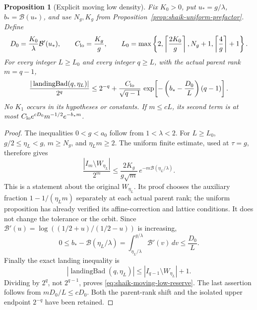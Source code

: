 \documentclass[11pt]{article}
\newtheorem{proposition}{Proposition}
\theoremstyle{remark}\newtheorem{remark}[proposition]{Remark}
\begin{document}
\begin{proposition}[Explicit moving low density]\label{prop:shaik-moving-low-reserve}
Fix \(K_0>0\), put \(u_*=g/\lambda\), \(b_*=\mathcal B(u_*)\), and use
\(N_g,K_g\) from Proposition~\ref{prop:shaik-uniform-prefactor}. Define
\[
 D_0=\frac{K_0}{\lambda}\mathcal B'(u_*),\qquad C_{\rm lo}=\frac{K_g}{g},
 \qquad
 L_0=\max\left\{2,\left\lceil\frac{2K_0}{g}\right\rceil,
                    N_g+1,\left\lceil\frac4g\right\rceil+1\right\}.
\]
For every integer \(L\ge L_0\) and every integer \(q\ge L\), with
the actual parent rank \(m=q-1\),
\begin{equation}\label{eq:shaik-moving-low-reserve}
 \frac{|\operatorname{landingBad}(q,\eta_L)|}{2^q}
 \le 2^{-q}+\frac{C_{\rm lo}}{\sqrt{q-1}}\,
       \exp\!\left[-\left(b_*-\frac{D_0}{L}\right)(q-1)\right].
\end{equation}
No \(K_1\) occurs in its hypotheses or constants.
If \(m\le cL\), its second term is at most
\(C_{\rm lo}e^{cD_0}m^{-1/2}e^{-b_*m}\).
\end{proposition}
\begin{proof}
The inequalities \(0<g<a_0\) follow from \(1<\lambda<2\).
For \(L\ge L_0\),
\(g/2\le\eta_L<g\), \(m\ge N_g\), and \(\eta_Lm\ge2\).
The uniform finite estimate, used at \(\tau=g\), therefore gives
\[
 \frac{|I_m\setminus W_{\eta_L}|}{2^m}
 \le \frac{2K_g}{g\sqrt m}\,
           e^{-m\mathcal B(\eta_L/\lambda)}.
\]
This is a statement about the original \(W_{\eta_L}\).
Its proof chooses the auxiliary fraction
\(1-1/(\eta_Lm)\) separately at each actual parent rank;
the uniform proposition has already verified its affine-correction
and lattice conditions. It does not change the tolerance or the orbit.
Since
\(\mathcal B'(u)=\log((1/2+u)/(1/2-u))\) is increasing,
\[
 0\le b_*-\mathcal B(\eta_L/\lambda)
   =\int_{\eta_L/\lambda}^{g/\lambda}\mathcal B'(v)\,dv
   \le\frac{D_0}{L}.
\]
Finally the exact landing inequality is
\[
 |\operatorname{landingBad}(q,\eta_L)|
       \le |I_{q-1}\setminus W_{\eta_L}|+1 .
\]
Dividing by \(2^q\), not \(2^{q-1}\), proves
\eqref{eq:shaik-moving-low-reserve}. The last assertion follows
from \(mD_0/L\le cD_0\). Both the parent-rank shift and the isolated
upper endpoint \(2^{-q}\) have been retained.
\end{proof}
\end{document}
